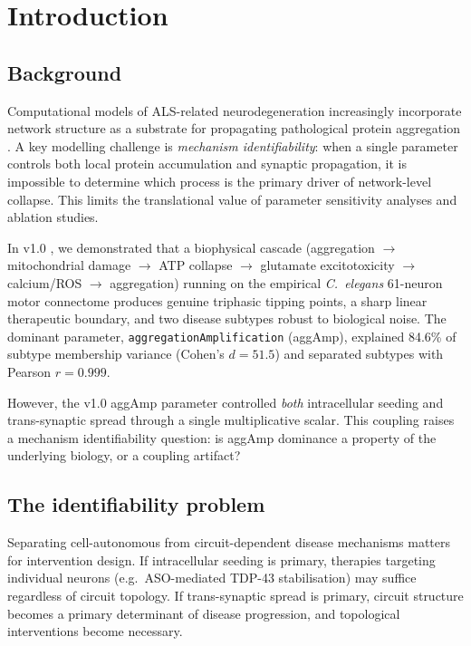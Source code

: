 \documentclass[12pt,a4paper]{article}
\begin{document}
\tableofcontents
\newpage

\section{Introduction}

\subsection{Background}

Computational models of ALS-related neurodegeneration increasingly incorporate network
structure as a substrate for propagating pathological protein aggregation \citep{neumann2006}.
A key modelling challenge is \emph{mechanism identifiability}: when a single parameter controls
both local protein accumulation and synaptic propagation, it is impossible to determine which
process is the primary driver of network-level collapse. This limits the translational value of
parameter sensitivity analyses and ablation studies.

In v1.0 \citep{rezaee2026v1}, we demonstrated that a biophysical cascade (aggregation $\to$
mitochondrial damage $\to$ ATP collapse $\to$ glutamate excitotoxicity $\to$ calcium/ROS $\to$
aggregation) running on the empirical \textit{C.~elegans} 61-neuron motor connectome produces
genuine triphasic tipping points, a sharp linear therapeutic boundary, and two disease subtypes
robust to biological noise. The dominant parameter, \texttt{aggregationAmplification}
(aggAmp), explained 84.6\% of subtype membership variance (Cohen's $d = 51.5$) and separated
subtypes with Pearson $r = 0.999$.

However, the v1.0 aggAmp parameter controlled \emph{both} intracellular seeding and
trans-synaptic spread through a single multiplicative scalar. This coupling raises a mechanism
identifiability question: is aggAmp dominance a property of the underlying biology, or a
coupling artifact?

\subsection{The identifiability problem}

Separating cell-autonomous from circuit-dependent disease mechanisms matters for intervention
design. If intracellular seeding is primary, therapies targeting individual neurons (e.g.\
ASO-mediated TDP-43 stabilisation) may suffice regardless of circuit topology. If
trans-synaptic spread is primary, circuit structure becomes a primary determinant of disease
progression, and topological interventions become necessary.
\end{document}
